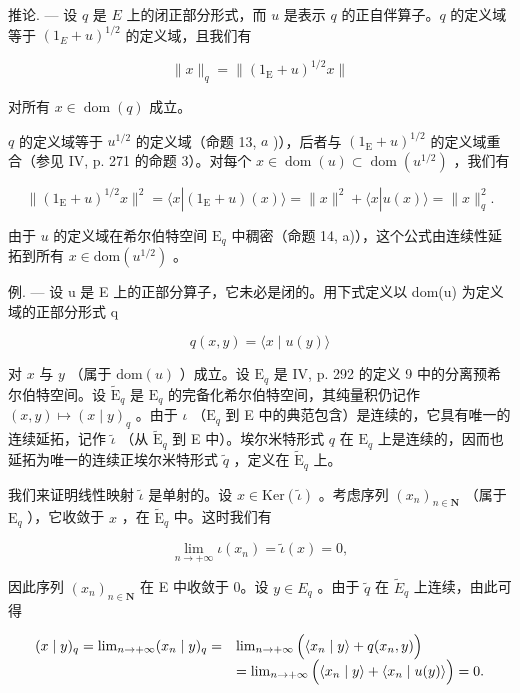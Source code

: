 推论. --- 设 \(q\) 是 \(E\) 上的闭正部分形式，而 \(u\) 是表示 \(q\) 的正自伴算子。\(q\) 的定义域等于 \((1_{E} + u)^{1/2}\) 的定义域，且我们有

\[
\| x \| _ {q} = \| (1 _ {\mathrm{E}} + u) ^ {1 / 2} x \|
\]

对所有 \(x \in \operatorname{dom}(q)\) 成立。

\(q\) 的定义域等于 \(u^{1/2}\) 的定义域（命题 13, \(a\) )），后者与 \((1_{\mathrm{E}} + u)^{1/2}\) 的定义域重合（参见 IV, p. 271 的命题 3）。对每个 \(x \in \operatorname{dom}(u) \subset \operatorname{dom}(u^{1/2})\) ，我们有

\[
\| (1 _ {\mathrm{E}} + u) ^ {1 / 2} x \| ^ {2} = \langle x | (1 _ {\mathrm{E}} + u) (x) \rangle = \| x \| ^ {2} + \langle x | u (x) \rangle = \| x \| _ {q} ^ {2}.
\]

由于 \(u\) 的定义域在希尔伯特空间 \(\mathrm{E}_q\) 中稠密（命题 14, a)），这个公式由连续性延拓到所有 \(x \in \mathrm{dom}(u^{1/2})\) 。

例. --- 设 u 是 E 上的正部分算子，它未必是闭的。用下式定义以 dom(u) 为定义域的正部分形式 q

\[
q (x, y) = \langle x \mid u (y) \rangle
\]

对 \(x\) 与 \(y\) （属于 \(\mathrm{dom}(u)\) ）成立。设 \(\mathrm{E}_q\) 是 IV, p. 292 的定义 9 中的分离预希尔伯特空间。设 \(\widetilde{\mathrm{E}}_q\) 是 \(\mathrm{E}_q\) 的完备化希尔伯特空间，其纯量积仍记作 \((x,y) \mapsto (x \mid y)_q\) 。由于 \(\iota\) （\(\mathrm{E}_q\) 到 E 中的典范包含）是连续的，它具有唯一的连续延拓，记作 \(\widetilde{\iota}\) （从 \(\widetilde{\mathrm{E}}_q\) 到 E 中）。埃尔米特形式 \(q\) 在 \(\mathrm{E}_q\) 上是连续的，因而也延拓为唯一的连续正埃尔米特形式 \(\widetilde{q}\) ，定义在 \(\widetilde{\mathrm{E}}_q\) 上。

我们来证明线性映射 \(\widetilde{\iota}\) 是单射的。设 \(x\in\mathrm{Ker}(\widetilde{\iota})\) 。考虑序列 \((x_{n})_{n\in\mathbf{N}}\) （属于 \(\mathrm{E}_{q}\) ），它收敛于 \(x\) ，在 \(\widetilde{\mathrm{E}}_{q}\) 中。这时我们有

\[
\lim _ {n \to + \infty} \iota (x _ {n}) = \widetilde {\iota} (x) = 0,
\]

因此序列 \((x_{n})_{n\in\mathbf{N}}\) 在 E 中收敛于 0。设 \(y\in E_{q}\) 。由于 \(\widetilde{q}\) 在 \(\widetilde{E}_{q}\) 上连续，由此可得

\[
\begin{array}{r l} (x \mid y) _ {q} = \lim _ {n \to + \infty} (x _ {n} \mid y) _ {q} = & \lim _ {n \to + \infty} \Big (\langle x _ {n} \mid y \rangle + q (x _ {n}, y) \Big) \\ & = \lim _ {n \to + \infty} \Big (\langle x _ {n} \mid y \rangle + \langle x _ {n} \mid u (y) \rangle \Big) = 0. \end{array}
\]

